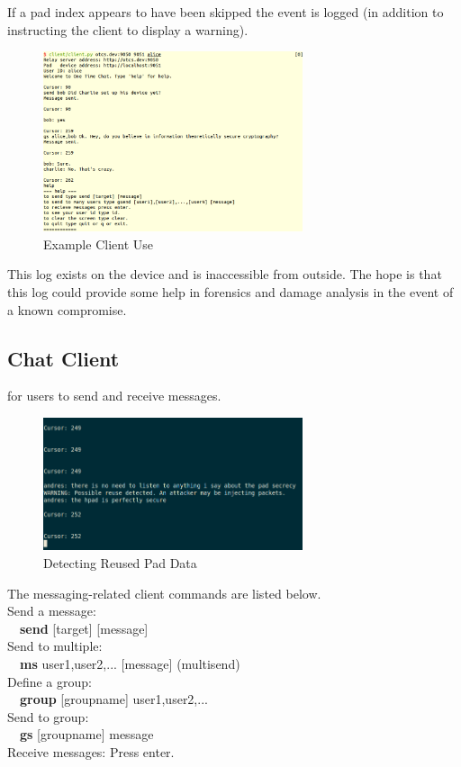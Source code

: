 \documentclass[twocolumn]{article}
\begin{document}
If a pad index appears to have been skipped the event is logged
(in addition to instructing the client
to display a warning).

\begin{figure}[htp]
\centering
\includegraphics[width=3in]{sample}
\caption{Example Client Use}
\end{figure}
\label{sec:clientexample}

This log exists on the device and is inaccessible from outside.
The hope is that this log could provide some help in forensics
and damage analysis in the event of a known compromise.


\subsection{Chat Client}
 for users to send and receive messages.


\begin{figure}[htp]
\centering
\includegraphics[width=3in]{reuse}
\caption{Detecting Reused Pad Data}
\end{figure}

The messaging-related client commands are listed below.\\
Send a message:\\
\-\ \-\ \textbf{send} [target] [message]\\
Send to multiple:\\
\-\ \-\ \textbf{ms} user1,user2,... [message] (multisend)\\
Define a group:\\
\-\ \-\ \textbf{group} [groupname] user1,user2,...\\
Send to group:\\
\-\ \-\ \textbf{gs} [groupname] message\\
Receive messages:
Press enter.
\end{document}
